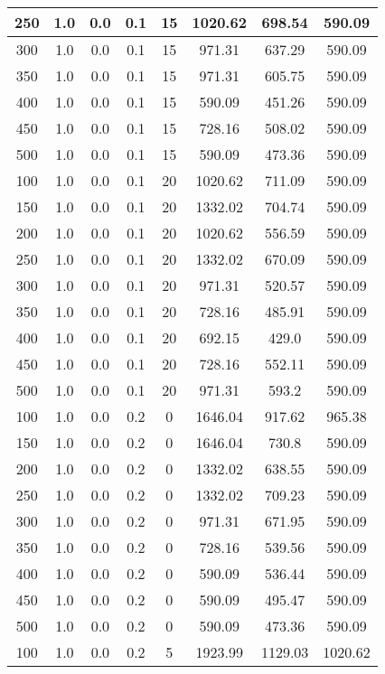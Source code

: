 \documentclass[a4paper, 12pt]{extreport}
\begin{document}
\begin{itemize}
\begin{longtable}{|c|c|c|c|c|c|c|c|}
			250 & 1.0 & 0.0 & 0.1 & 15 & 1020.62 & 698.54 & 590.09 \\\hline
			300 & 1.0 & 0.0 & 0.1 & 15 & 971.31 & 637.29 & 590.09 \\\hline
			350 & 1.0 & 0.0 & 0.1 & 15 & 971.31 & 605.75 & 590.09 \\\hline
			400 & 1.0 & 0.0 & 0.1 & 15 & 590.09 & 451.26 & 590.09 \\\hline
			450 & 1.0 & 0.0 & 0.1 & 15 & 728.16 & 508.02 & 590.09 \\\hline
			500 & 1.0 & 0.0 & 0.1 & 15 & 590.09 & 473.36 & 590.09 \\\hline
			100 & 1.0 & 0.0 & 0.1 & 20 & 1020.62 & 711.09 & 590.09 \\\hline
			150 & 1.0 & 0.0 & 0.1 & 20 & 1332.02 & 704.74 & 590.09 \\\hline
			200 & 1.0 & 0.0 & 0.1 & 20 & 1020.62 & 556.59 & 590.09 \\\hline
			250 & 1.0 & 0.0 & 0.1 & 20 & 1332.02 & 670.09 & 590.09 \\\hline
			300 & 1.0 & 0.0 & 0.1 & 20 & 971.31 & 520.57 & 590.09 \\\hline
			350 & 1.0 & 0.0 & 0.1 & 20 & 728.16 & 485.91 & 590.09 \\\hline
			400 & 1.0 & 0.0 & 0.1 & 20 & 692.15 & 429.0 & 590.09 \\\hline
			450 & 1.0 & 0.0 & 0.1 & 20 & 728.16 & 552.11 & 590.09 \\\hline
			500 & 1.0 & 0.0 & 0.1 & 20 & 971.31 & 593.2 & 590.09 \\\hline
			100 & 1.0 & 0.0 & 0.2 & 0 & 1646.04 & 917.62 & 965.38 \\\hline
			150 & 1.0 & 0.0 & 0.2 & 0 & 1646.04 & 730.8 & 590.09 \\\hline
			200 & 1.0 & 0.0 & 0.2 & 0 & 1332.02 & 638.55 & 590.09 \\\hline
			250 & 1.0 & 0.0 & 0.2 & 0 & 1332.02 & 709.23 & 590.09 \\\hline
			300 & 1.0 & 0.0 & 0.2 & 0 & 971.31 & 671.95 & 590.09 \\\hline
			350 & 1.0 & 0.0 & 0.2 & 0 & 728.16 & 539.56 & 590.09 \\\hline
			400 & 1.0 & 0.0 & 0.2 & 0 & 590.09 & 536.44 & 590.09 \\\hline
			450 & 1.0 & 0.0 & 0.2 & 0 & 590.09 & 495.47 & 590.09 \\\hline
			500 & 1.0 & 0.0 & 0.2 & 0 & 590.09 & 473.36 & 590.09 \\\hline
			100 & 1.0 & 0.0 & 0.2 & 5 & 1923.99 & 1129.03 & 1020.62 \\\hline

\end{longtable}
\end{itemize}
\end{document}
